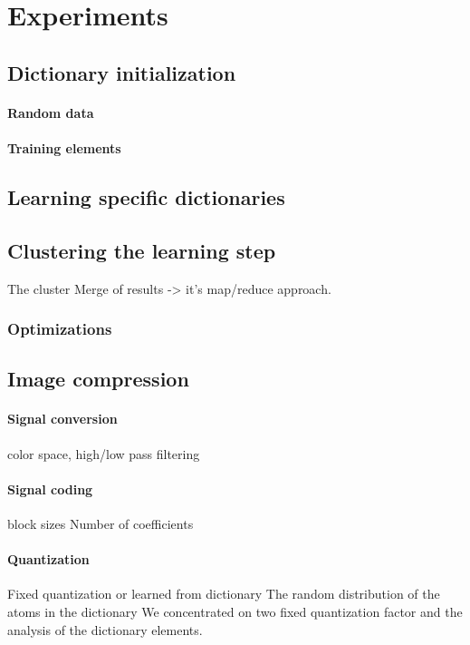 \section{Experiments}

\subsection{Dictionary initialization}
\paragraph{Random data} 
\paragraph{Training elements}


\subsection{Learning specific dictionaries}


\subsection{Clustering the learning step}
The cluster Merge of results -> it's  map/reduce approach. 
\subsubsection*{Optimizations}


\subsection{Image compression}
\paragraph{Signal conversion}
color space, high/low pass filtering

\paragraph{Signal coding}
block sizes
Number of coefficients


\paragraph{Quantization}
Fixed quantization or learned from dictionary
The random distribution of the atoms in the dictionary 
We concentrated on two fixed quantization factor and the analysis of the dictionary elements.

